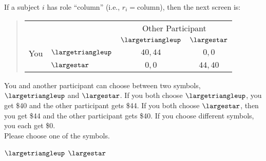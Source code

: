 \documentclass[11pt]{article}
\begin{document}
If a subject $i$ has role ``column'' (i.e., $r_i=\text{column}$), then the next screen is:
\begin{tcolorbox}
\begin{quote}
\begin{center}
\begin{tabular}{llcc}
    & & \multicolumn{2}{c}{Other Participant}  \\
& & $\largetriangleup$ & $\largestar$  \\ \cline{3-4}
You & $\largetriangleup$ & \multicolumn{1}{|c|}{$40,44$} & \multicolumn{1}{c|}{$0,0$}  \\ \cline{3-4}
& $\largestar$ & \multicolumn{1}{|c|}{$0,0$} & \multicolumn{1}{c|}{$44,40$}  \\ \cline{3-4}
\end{tabular}
\end{center}
\end{quote}

You and another participant can choose between two symbols, $\largetriangleup$ and $\largestar$. If you both choose $\largetriangleup$, you get \$40 and the other participant gets \$44. If you both choose $\largestar$, then you get \$44 and the other participant gets \$40. If you choose different symbols, you each get \$0.\\

Please choose one of the symbols.\\

\begin{center}
$\largetriangleup$ \qquad $\largestar$
\end{center}
\end{tcolorbox}
\end{document}
